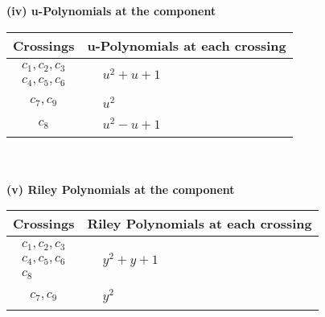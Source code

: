 \documentclass[1p]{elsarticle_modified}
\theoremstyle{definition}
\begin{document}
\newpage\renewcommand{\arraystretch}{1}
\flushleft \textbf{(iv) u-Polynomials at the component}\newline \\
\begin{tabular}{m{50pt}|m{274pt}}
Crossings & \hspace{64pt}u-Polynomials at each crossing \\
\hline $$\begin{aligned}c_{1},c_{2},c_{3}\\c_{4},c_{5},c_{6}\end{aligned}$$&$\begin{aligned}
&u^2+u+1
\end{aligned}$\\
\hline $$\begin{aligned}c_{7},c_{9}\end{aligned}$$&$\begin{aligned}
&u^2
\end{aligned}$\\
\hline $$\begin{aligned}c_{8}\end{aligned}$$&$\begin{aligned}
&u^2- u+1
\end{aligned}$\\
\hline
\end{tabular}\\~\\
\newpage\renewcommand{\arraystretch}{1}
\flushleft \textbf{(v) Riley Polynomials at the component}\newline \\
\begin{tabular}{m{50pt}|m{274pt}}
Crossings & \hspace{64pt}Riley Polynomials at each crossing \\
\hline $$\begin{aligned}c_{1},c_{2},c_{3}\\c_{4},c_{5},c_{6}\\c_{8}\end{aligned}$$&$\begin{aligned}
&y^2+y+1
\end{aligned}$\\
\hline $$\begin{aligned}c_{7},c_{9}\end{aligned}$$&$\begin{aligned}
&y^2
\end{aligned}$\\
\hline
\end{tabular}\\~\\
\end{document}
